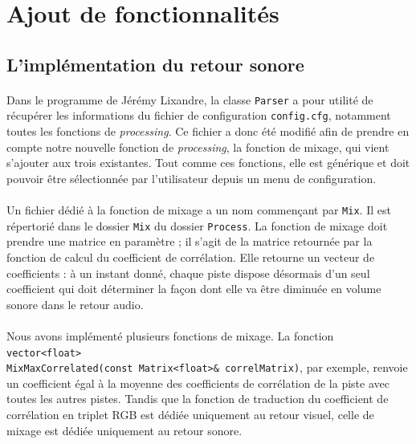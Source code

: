 \section{Ajout de fonctionnalités}

\subsection{L'implémentation du retour sonore}
\paragraph{}
Dans le programme de Jérémy Lixandre, la classe \verb!Parser! a pour
utilité de récupérer les informations du fichier de configuration
\verb!config.cfg!, notamment toutes les fonctions de
\textit{processing}. Ce fichier a donc été modifié afin de prendre en
compte notre nouvelle fonction de \textit{processing}, la fonction de
mixage, qui vient s'ajouter aux trois existantes. Tout comme ces
fonctions, elle est générique et doit pouvoir être sélectionnée par
l'utilisateur depuis un menu de configuration.

\paragraph{}
Un fichier dédié à la fonction de mixage a un nom commençant par
\verb!Mix!. Il est répertorié dans le dossier \verb!Mix! du dossier
\verb!Process!. La fonction de mixage doit prendre une matrice en
paramètre ; il s'agit de la matrice retournée par la fonction de
calcul du coefficient de corrélation. Elle retourne un vecteur de
coefficients : à un instant donné, chaque piste dispose désormais d'un
seul coefficient qui doit déterminer la façon dont elle va être
diminuée en volume sonore dans le retour audio.

\paragraph{}
Nous avons implémenté plusieurs fonctions de mixage. La fonction
\verb!vector<float>!
\\ \verb!MixMaxCorrelated(const Matrix<float>& correlMatrix)!, par
exemple, renvoie un coefficient égal à la moyenne des coefficients de
corrélation de la piste avec toutes les autres pistes. Tandis que la
fonction de traduction du coefficient de corrélation en triplet RGB
est dédiée uniquement au retour visuel, celle de mixage est dédiée
uniquement au retour sonore.

